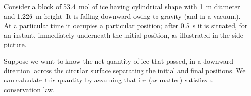 \documentclass[a4paper,12pt,%
onecolumn,oneside,titlepage,%
british%
]{memoir}
\renewcommand*{\|}[1][]{\nonscript\:#1\vert\nonscript\:\mathopen{}}
\begin{document}
Consider a block of \qty{53.4}{mol} of ice having cylindrical shape with \qty{1}{m} diameter and \qty{1.226}{m} height. It is falling downward owing to gravity (and in a vacuum). At a particular time it occupies a particular position; after \qty{0.5}{s} it is situated, for an instant, immediately underneath the initial position, as illustrated in the side picture.
%

Suppose we want to know the net quantity of ice that passed, in a downward direction, across the circular surface separating the initial and final positions. We can calculate this quantity by assuming that ice (as matter) satisfies a conservation law.
\end{document}
